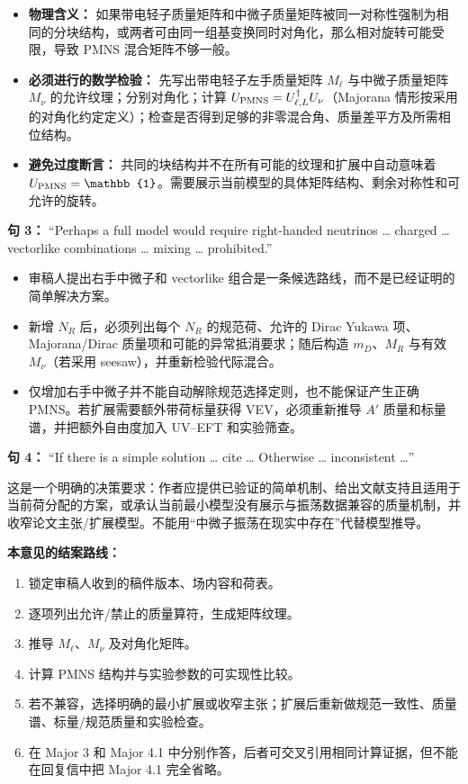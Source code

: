 \documentclass[
]{article}
\providecommand{\tightlist}{%
  \setlength{\itemsep}{0pt}\setlength{\parskip}{0pt}}
\begin{document}
\begin{itemize}
\tightlist
\item
  \textbf{物理含义：}
  如果带电轻子质量矩阵和中微子质量矩阵被同一对称性强制为相同的分块结构，或两者可由同一组基变换同时对角化，那么相对旋转可能受限，导致
  PMNS 混合矩阵不够一般。
\item
  \textbf{必须进行的数学检验：} 先写出带电轻子左手质量矩阵 \(M_\ell\)
  与中微子质量矩阵 \(M_\nu\) 的允许纹理；分别对角化；计算
  \(U_{\rm PMNS}=U_{\ell,L}^\dagger U_\nu\)（Majorana
  情形按采用的对角化约定定义）；检查是否得到足够的非零混合角、质量差平方及所需相位结构。
\item
  \textbf{避免过度断言：}
  共同的块结构并不在所有可能的纹理和扩展中自动意味着
  \(U_{\rm PMNS}=\mathbb{1}\)。需要展示当前模型的具体矩阵结构、剩余对称性和可允许的旋转。
\end{itemize}

\textbf{句 3：} ``Perhaps a full model would require right-handed
neutrinos \ldots{} charged \ldots{} vectorlike combinations \ldots{}
mixing \ldots{} prohibited.''

\begin{itemize}
\tightlist
\item
  审稿人提出右手中微子和 vectorlike
  组合是一条候选路线，而不是已经证明的简单解决方案。
\item
  新增 \(N_R\) 后，必须列出每个 \(N_R\) 的规范荷、允许的 Dirac Yukawa
  项、Majorana/Dirac 质量项和可能的异常抵消要求；随后构造
  \(m_D\)、\(M_R\) 与有效 \(M_\nu\)（若采用
  seesaw），并重新检验代际混合。
\item
  仅增加右手中微子并不能自动解除规范选择定则，也不能保证产生正确
  PMNS。若扩展需要额外带荷标量获得 VEV，必须重新推导 \(A'\)
  质量和标量谱，并把额外自由度加入 UV--EFT 和实验筛查。
\end{itemize}

\textbf{句 4：} ``If there is a simple solution \ldots{} cite \ldots{}
Otherwise \ldots{} inconsistent \ldots{}''

这是一个明确的决策要求：作者应提供已验证的简单机制、给出文献支持且适用于当前荷分配的方案，或承认当前最小模型没有展示与振荡数据兼容的质量机制，并收窄论文主张/扩展模型。不能用``中微子振荡在现实中存在''代替模型推导。

\textbf{本意见的结案路线：}

\begin{enumerate}
\def\labelenumi{\arabic{enumi}.}
\tightlist
\item
  锁定审稿人收到的稿件版本、场内容和荷表。
\item
  逐项列出允许/禁止的质量算符，生成矩阵纹理。
\item
  推导 \(M_\ell\)、\(M_\nu\) 及对角化矩阵。
\item
  计算 PMNS 结构并与实验参数的可实现性比较。
\item
  若不兼容，选择明确的最小扩展或收窄主张；扩展后重新做规范一致性、质量谱、标量/规范质量和实验检查。
\item
  在 Major 3 和 Major 4.1
  中分别作答，后者可交叉引用相同计算证据，但不能在回复信中把 Major 4.1
  完全省略。
\end{enumerate}
\end{document}
